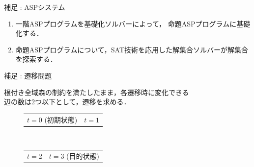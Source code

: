 \documentclass[dvipdfmx,11pt]{beamer}
\begin{document}
\begin{frame}{補足 : ASPシステム}
 
 \vspace{-0.5cm}

 \begin{figure}[htbp]
  \centering
  
 \end{figure}

 \vspace{-0.5cm}

 \begin{exampleblock}{}
  \begin{enumerate}
   \item 一階ASPプログラムを基礎化ソルバーによって，
		 命題ASPプログラムに\alert{基礎化}する．
   \item 命題ASPプログラムについて，SAT技術を応用した解集合ソルバーが解集合を探索する．
  \end{enumerate}
 \end{exampleblock}

\end{frame}

\begin{frame}{補足 : 遷移問題}
 \begin{block}{}
   根付き全域森の制約を満たしたまま，各遷移時に変化できる\\
  辺の数は2つ以下として，遷移を求める．
 \end{block}
 \vspace{-0.15cm}
 \begin{exampleblock}{}
  \begin{figure}[htbp]
   \begin{tabular}[tb]{cc}
	\begin{minipage}{0.5\hsize}
	 \centering
	 
	 $t=0$ (初期状態)
	\end{minipage}
	& 
	\hspace{-0.5cm}
	\begin{minipage}{0.5\hsize}
	 \centering
	 
	 $t=1$
	\end{minipage} 
   \end{tabular}\\
   \vspace{0.25cm}
   \begin{tabular}[tb]{cc}
	\begin{minipage}{0.5\hsize}
	 \centering
	 
	 $t=2$
	\end{minipage}
	&
	\hspace{-0.5cm}
	\begin{minipage}{0.5\hsize}
	\centering
	 
	 $t=3$ (目的状態)
	\end{minipage}
   \end{tabular}
  \end{figure}
 \end{exampleblock}
\end{frame}
\end{document}
